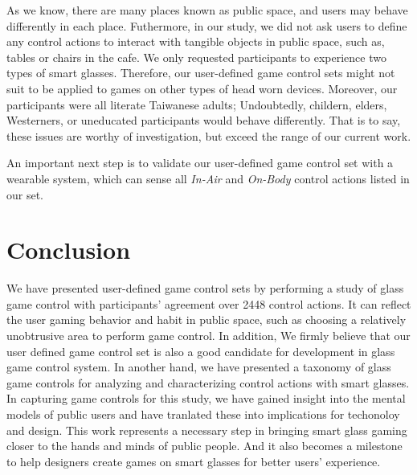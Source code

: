 \documentclass{sigchi}
\begin{document}
  As we know, there are many places known as public space, and users may behave differently in each place. Futhermore, in our study, we did not ask users to define any control actions to interact with tangible objects in public space, such as, tables or chairs in the cafe. We only requested participants to experience two types of smart glasses. Therefore, our user-defined game control sets might not suit to be applied to games on other types of head worn devices. Moreover, our participants were all literate Taiwanese adults; Undoubtedly, childern, elders, Westerners, or uneducated participants would behave differently. That is to say, these issues are worthy of investigation, but exceed the range of our current work.

  An important next step is to validate our user-defined game control set with a wearable system, which can sense all \emph{In-Air} and \emph{On-Body} control actions listed in our set.   


\section{Conclusion}

We have presented user-defined game control sets by performing a study of glass game control with participants' agreement over 2448 control actions.
It can reflect the user gaming behavior and habit in public space, such as choosing a relatively unobtrusive area to perform game control. In addition, We firmly believe that our user defined game control set is also a good candidate for development in glass game control system. In another hand, we have presented a taxonomy of glass game controls for analyzing and characterizing control actions with smart glasses. 
In capturing game controls for this study, we have gained insight into the mental models of public users and have tranlated these into implications for techonoloy and design. 
This work represents a necessary step in bringing smart glass gaming closer to the hands and minds of public people. And it also becomes a milestone to help designers create games on smart glasses for better users' experience.

\end{document}
